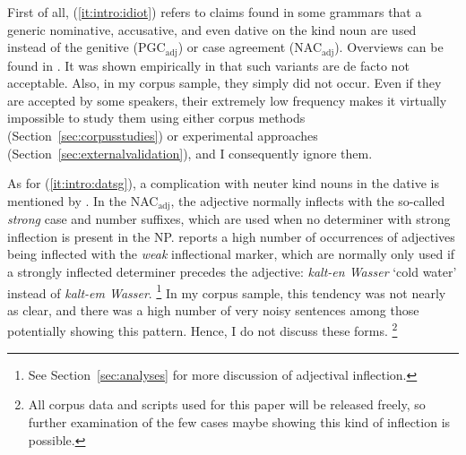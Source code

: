 \documentclass[USenglish]{article}
\newcommand{\Sub}[1]{\ensuremath{\mathrm{_{#1}}}}
\newcommand{\NACa}{NAC\Sub{adj}}
\newcommand{\PGCa}{PGC\Sub{adj}}
\begin{document}
\vspace{-1\baselineskip}

First of all, (\ref{it:intro:idiot}) refers to claims found in some grammars that a generic nominative, accusative, and even dative on the kind noun are used instead of the genitive (\PGCa) or case agreement (\NACa).
Overviews can be found in \citealp{Hentschel1993,Zimmer2015}.
It was shown empirically in \cite{Hentschel1993} that such variants are de facto not acceptable.
Also, in my corpus sample, they simply did not occur.
Even if they are accepted by some speakers, their extremely low frequency makes it virtually impossible to study them using either corpus methods (Section~\ref{sec:corpusstudies}) or experimental approaches (Section~\ref{sec:externalvalidation}), and I consequently ignore them.

As for (\ref{it:intro:datsg}), a complication with neuter kind nouns in the dative is mentioned by \citet[20--22]{Zimmer2015}.
In the \NACa, the adjective normally inflects with the so-called \textit{strong} case and number suffixes, which are used when no determiner with strong inflection is present in the NP.
\cite{Zimmer2015} reports a high number of occurrences of adjectives being inflected with the \textit{weak} inflectional marker, which are normally only used if a strongly inflected determiner precedes the adjective: \textit{kalt-en Wasser} `cold water' instead of \textit{kalt-em Wasser}.%
\footnote{See Section~\ref{sec:analyses} for more discussion of adjectival inflection.}
In my corpus sample, this tendency was not nearly as clear, and there was a high number of very noisy sentences among those potentially showing this pattern.
Hence, I do not discuss these forms.%
\footnote{All corpus data and scripts used for this paper will be released freely, so further examination of the few cases maybe showing this kind of inflection is possible.}
\end{document}
